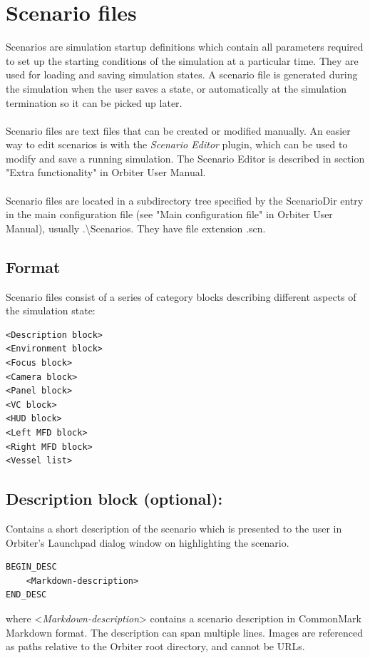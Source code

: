 \documentclass[Orbiter Developer Manual.tex]{subfiles}
\begin{document}
\section{Scenario files}
\label{sec:scn_files}
Scenarios are simulation startup definitions which contain all parameters required to set up the starting conditions of the simulation at a particular time. They are used for loading and saving simulation states. A scenario file is generated during the simulation when the user saves a state, or automatically at the simulation termination so it can be picked up later.\\
\\
Scenario files are text files that can be created or modified manually. An easier way to edit scenarios is with the \textit{Scenario Editor} plugin, which can be used to modify and save a running simulation. The Scenario Editor is described in section "Extra functionality" in Orbiter User Manual.\\
\\
Scenario files are located in a subdirectory tree specified by the ScenarioDir entry in the main configuration file (see "Main configuration file" in Orbiter User Manual), usually .\textbackslash Scenarios. They have file extension .scn.


\subsection*{Format}
Scenario files consist of a series of category blocks describing different aspects of the simulation state:

\begin{lstlisting}[language=OSFS]
<Description block>
<Environment block>
<Focus block>
<Camera block>
<Panel block>
<VC block>
<HUD block>
<Left MFD block>
<Right MFD block>
<Vessel list>
\end{lstlisting}


\subsection*{Description block (optional):}
Contains a short description of the scenario which is presented to the user in Orbiter's Launchpad dialog window on highlighting the scenario.

\begin{lstlisting}[language=OSFS]
BEGIN_DESC
	<Markdown-description>
END_DESC
\end{lstlisting}

\noindent
where <\textit{Markdown-description}> contains a scenario description in CommonMark Markdown format. The description can span multiple lines. Images are referenced as paths relative to the Orbiter root directory, and cannot be URLs.
\end{document}
